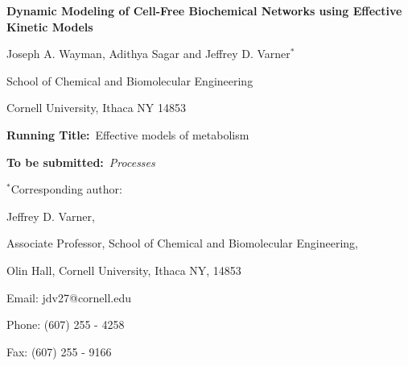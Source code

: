 \documentclass[12pt]{article}
\begin{document}
\begin{titlepage}
{\par\centering\textbf{\Large Dynamic Modeling of Cell-Free Biochemical Networks using Effective Kinetic Models}}
\vspace{0.05in}
{\par \centering \large{Joseph A. Wayman, Adithya Sagar and Jeffrey D. Varner$^{*}$}}
\vspace{0.10in}
{\par \centering \large{School of Chemical and Biomolecular Engineering}}
{\par \centering \large{Cornell University, Ithaca NY 14853}}
\vspace{0.1in}
{\par \centering \textbf{Running Title:}~Effective models of metabolism}
\vspace{0.1in}
{\par \centering \textbf{To be submitted:}~\textit{Processes}}
\vspace{0.5in}
{\par \centering $^{*}$Corresponding author:}
{\par \centering Jeffrey D. Varner,}
{\par \centering Associate Professor, School of Chemical and Biomolecular Engineering,}
{\par {} Olin Hall, Cornell University, Ithaca NY, 14853} 
{\par \centering Email: jdv27@cornell.edu} 
{\par \centering Phone: (607) 255 - 4258}
{\par \centering Fax: (607) 255 - 9166}
\end{titlepage}
\date{}
\thispagestyle{empty}
\pagebreak
\end{document}
